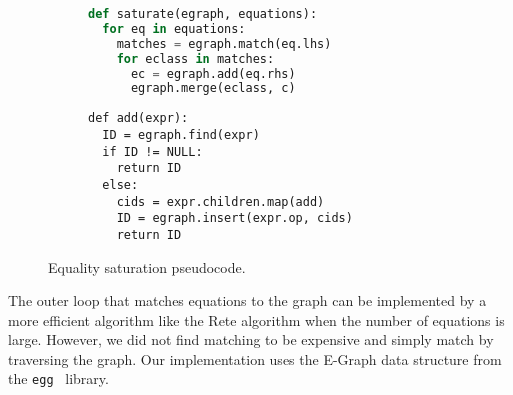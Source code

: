 \begin{figure}
\begin{subfigure}[t]{.49\textwidth}
\begin{lstlisting}[language=Python]
def saturate(egraph, equations):
  for eq in equations: 
    matches = egraph.match(eq.lhs)
    for eclass in matches: 
      ec = egraph.add(eq.rhs)
      egraph.merge(eclass, c)
\end{lstlisting}
\end{subfigure}
\begin{subfigure}[t]{.5\textwidth}
\begin{lstlisting}
def add(expr):
  ID = egraph.find(expr)
  if ID != NULL:
    return ID
  else:
    cids = expr.children.map(add)
    ID = egraph.insert(expr.op, cids)
    return ID
\end{lstlisting}
\end{subfigure}
    \caption{Equality saturation pseudocode. 
}
    \label{eqsat}
    \vspace{7pt}
\end{figure}

The outer loop that matches equations to the graph can be implemented by a more
efficient algorithm like the Rete algorithm \cite{DBLP:journals/ai/Forgy82} when
the number of equations is large. However, we did not find matching to be
expensive and simply match by traversing the graph. Our implementation uses the
E-Graph data structure from the \texttt{egg}~\cite{willsey2020egg} library. 
